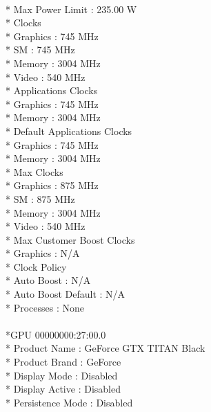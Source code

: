 \documentclass{article}
\begin{document}
       \\*  Max Power Limit                   : 235.00 W
   \\*  Clocks
     \\*    Graphics                          : 745 MHz
     \\*    SM                                : 745 MHz
      \\*   Memory                            : 3004 MHz
      \\*   Video                             : 540 MHz
    \\* Applications Clocks
     \\*    Graphics                          : 745 MHz
     \\*    Memory                            : 3004 MHz
    \\* Default Applications Clocks
    \\*     Graphics                          : 745 MHz
    \\*     Memory                            : 3004 MHz
    \\* Max Clocks
    \\*     Graphics                          : 875 MHz
     \\*    SM                                : 875 MHz
    \\*     Memory                            : 3004 MHz
     \\*    Video                             : 540 MHz
    \\* Max Customer Boost Clocks
    \\*     Graphics                          : N/A
   \\*  Clock Policy
   \\*      Auto Boost                        : N/A
    \\*     Auto Boost Default                : N/A
   \\*  Processes                             : None
\\
 \\*GPU 00000000:27:00.0
  \\*   Product Name                          : GeForce GTX TITAN Black
   \\*  Product Brand                         : GeForce
   \\*  Display Mode                          : Disabled
   \\*  Display Active                        : Disabled
   \\*  Persistence Mode                      : Disabled
\end{document}
